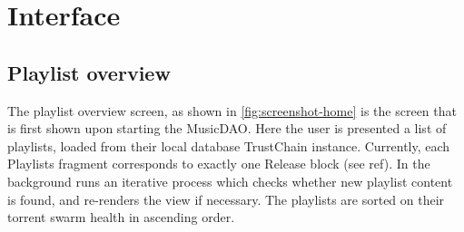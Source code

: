 \section{Interface}
\subsection{Playlist overview}
The playlist overview screen, as shown in \ref{fig:screenshot-home} is the screen that is first shown upon starting the MusicDAO. Here the user is presented a list of playlists, loaded from their local database TrustChain instance. Currently, each Playlists fragment corresponds to exactly one Release block (see ref). In the background runs an iterative process which checks whether new playlist content is found, and re-renders the view if necessary. The playlists are sorted on their torrent swarm health in ascending order. 

